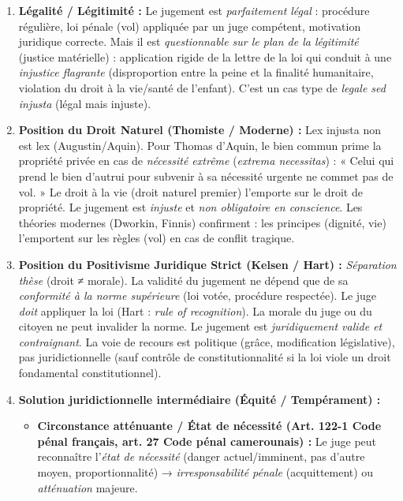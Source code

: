 \documentclass[11pt]{article}
\begin{document}
\begin{corrige}
\begin{enumerate}
    \item \textbf{Légalité / Légitimité :} Le jugement est \emph{parfaitement légal} : procédure régulière, loi pénale (vol) appliquée par un juge compétent, motivation juridique correcte. Mais il est \emph{questionnable sur le plan de la légitimité} (justice matérielle) : application rigide de la lettre de la loi qui conduit à une \emph{injustice flagrante} (disproportion entre la peine et la finalité humanitaire, violation du droit à la vie/santé de l'enfant). C'est un cas type de \emph{legale sed injusta} (légal mais injuste).
    \item \textbf{Position du Droit Naturel (Thomiste / Moderne) :} \guillemotleft Lex injusta non est lex \guillemotright (Augustin/Aquin). Pour Thomas d'Aquin, le bien commun prime la propriété privée en cas de \emph{nécessité extrême} (\emph{extrema necessitas}) : « Celui qui prend le bien d'autrui pour subvenir à sa nécessité urgente ne commet pas de vol. » Le droit à la vie (droit naturel premier) l'emporte sur le droit de propriété. Le jugement est \emph{injuste} et \emph{non obligatoire en conscience}. Les théories modernes (Dworkin, Finnis) confirment : les principes (dignité, vie) l'emportent sur les règles (vol) en cas de conflit tragique.
    \item \textbf{Position du Positivisme Juridique Strict (Kelsen / Hart) :} \emph{Séparation thèse} (droit ≠ morale). La validité du jugement ne dépend que de sa \emph{conformité à la norme supérieure} (loi votée, procédure respectée). Le juge \emph{doit} appliquer la loi (Hart : \emph{rule of recognition}). La morale du juge ou du citoyen ne peut invalider la norme. Le jugement est \emph{juridiquement valide et contraignant}. La voie de recours est politique (grâce, modification législative), pas juridictionnelle (sauf contrôle de constitutionnalité si la loi viole un droit fondamental constitutionnel).
    \item \textbf{Solution juridictionnelle intermédiaire (Équité / Tempérament) :}
    \begin{itemize}
        \item \textbf{Circonstance atténuante / État de nécessité (Art. 122-1 Code pénal français, art. 27 Code pénal camerounais) :} Le juge peut reconnaître l'\emph{état de nécessité} (danger actuel/imminent, pas d'autre moyen, proportionnalité) → \emph{irresponsabilité pénale} (acquittement) ou \emph{atténuation} majeure.

\end{itemize}
\end{enumerate}
\end{corrige}
\end{document}
